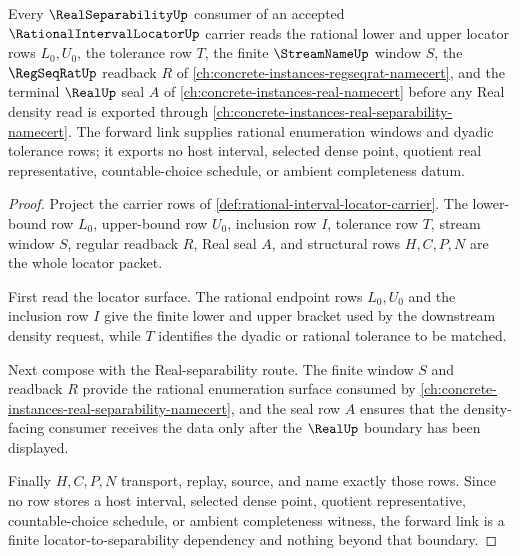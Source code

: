 \begin{theorem}
\label{thm:rational-interval-locator-real-separability-forward-link}
Every $\RealSeparabilityUp$ consumer of an accepted $\RationalIntervalLocatorUp$ carrier reads the rational lower and upper locator rows $L_0,U_0$, the tolerance row $T$, the finite $\StreamNameUp$ window $S$, the $\RegSeqRatUp$ readback $R$ of \autoref{ch:concrete-instances-regseqrat-namecert}, and the terminal $\RealUp$ seal $A$ of \autoref{ch:concrete-instances-real-namecert} before any Real density read is exported through \autoref{ch:concrete-instances-real-separability-namecert}. The forward link supplies rational enumeration windows and dyadic tolerance rows; it exports no host interval, selected dense point, quotient real representative, countable-choice schedule, or ambient completeness datum.
\end{theorem}
\begin{proof}
Project the carrier rows of \autoref{def:rational-interval-locator-carrier}. The lower-bound row $L_0$, upper-bound row $U_0$, inclusion row $I$, tolerance row $T$, stream window $S$, regular readback $R$, Real seal $A$, and structural rows $H,C,P,N$ are the whole locator packet.

First read the locator surface. The rational endpoint rows $L_0,U_0$ and the inclusion row $I$ give the finite lower and upper bracket used by the downstream density request, while $T$ identifies the dyadic or rational tolerance to be matched.

Next compose with the Real-separability route. The finite window $S$ and readback $R$ provide the rational enumeration surface consumed by \autoref{ch:concrete-instances-real-separability-namecert}, and the seal row $A$ ensures that the density-facing consumer receives the data only after the $\RealUp$ boundary has been displayed.

Finally $H,C,P,N$ transport, replay, source, and name exactly those rows. Since no row stores a host interval, selected dense point, quotient representative, countable-choice schedule, or ambient completeness witness, the forward link is a finite locator-to-separability dependency and nothing beyond that boundary.
\end{proof}

